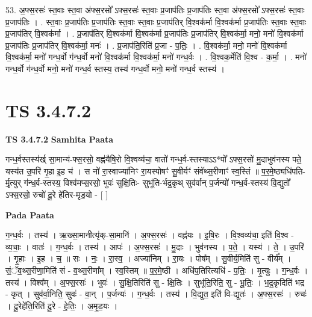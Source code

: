 \documentclass[17pt]{extarticle}
\begin{document}
53. अ॒फ्स॒रसः॑ स्त॒वाः स्त॒वा अ॑फ्स॒रसो᳚ ऽफ्स॒रसः॑ स्त॒वाः प्र॒जाप॑तिः प्र॒जाप॑तिः स्त॒वा अ॑फ्स॒रसो᳚ ऽफ्स॒रसः॑ स्त॒वाः प्र॒जाप॑तिः । . स्त॒वाः प्र॒जाप॑तिः प्र॒जाप॑तिः स्त॒वाः स्त॒वाः प्र॒जाप॑तिर् वि॒श्वक॑र्मा वि॒श्वक॑र्मा प्र॒जाप॑तिः स्त॒वाः स्त॒वाः 
प्र॒जाप॑तिर् वि॒श्वक॑र्मा । . प्र॒जाप॑तिर् वि॒श्वक॑र्मा वि॒श्वक॑र्मा प्र॒जाप॑तिः प्र॒जाप॑तिर् वि॒श्वक॑र्मा॒ मनो॒ मनो॑ वि॒श्वक॑र्मा 
प्र॒जाप॑तिः प्र॒जाप॑तिर् वि॒श्वक॑र्मा॒ मनः॑ । . प्र॒जाप॑ति॒रिति॑ प्र॒जा - प॒तिः॒ । . वि॒श्वक॑र्मा॒ मनो॒ मनो॑ वि॒श्वक॑र्मा वि॒श्वक॑र्मा॒ मनो॑ गन्ध॒र्वो ग॑न्ध॒र्वो मनो॑ वि॒श्वक॑र्मा वि॒श्वक॑र्मा॒ मनो॑ गन्ध॒र्वः । . वि॒श्वक॒र्मेति॑ वि॒श्व - क॒र्मा॒ । . मनो॑ गन्ध॒र्वो ग॑न्ध॒र्वो मनो॒ मनो॑ गन्ध॒र्व स्तस्य॒ तस्य॑ गन्ध॒र्वो मनो॒ मनो॑ गन्ध॒र्व स्तस्य॑ । \newline
\pagebreak
{}

\section{ TS 3.4.7.2 }

\textbf{TS 3.4.7.2 } \newline
\textbf{Samhita Paata} \newline

गन्ध॒र्वस्तस्य॑र्ख् सा॒मान्य॑-फ्स॒रसो॒ वह्न॑यैषि॒रो वि॒श्वव्य॑चा॒ वातो॑ गन्ध॒र्व-स्तस्याऽऽ*पो᳚ ऽफ्स॒रसो॑ मु॒दाभुव॑नस्य पते॒ यस्य॑त उ॒परि॑ गृ॒हा इ॒ह च॑ । स नो॑ रा॒स्वाज्या॑निꣳ रा॒यस्पोषꣳ॑ सु॒वीर्यꣳ॑ संवॅथ्स॒रीणाꣳ॑ स्व॒स्तिं ॥ प॒र॒मे॒ष्ठ्यधि॑पति-र्मृ॒त्युर् ग॑न्ध॒र्व-स्तस्य॒ विश्व॑मप्स॒रसो॒ भुवः॑ सुक्षि॒तिः- सुभू॑ति-र्भद्र॒कृथ् सुव॑र्वान् प॒र्जन्यो॑ गन्ध॒र्व-स्तस्य॑ वि॒द्युतो᳚ ऽफ्स॒रसो॒ रुचो॑ दू॒रे हे॑तिर-मृड॒यो - [  ] \newline

\textbf{Pada Paata} \newline

ग॒न्ध॒र्वः । तस्य॑ । ऋ॒ख्सा॒मानीत्यृ॑क्-सा॒मानि॑ । अ॒फ्स॒रसः॑ । वह्न॑यः । इ॒षि॒रः । वि॒श्वव्य॑चा॒ इति॑ वि॒श्व - व्य॒चाः॒ । वातः॑ । ग॒न्ध॒र्वः । तस्य॑ । आपः॑ । अ॒फ्स॒रसः॑ । मु॒दाः । भुव॑नस्य । प॒ते॒ । यस्य॑ । ते॒ । उ॒परि॑ । गृ॒हाः । इ॒ह । च॒ ॥ सः । नः॒ । रा॒स्व॒ । अज्या॑निम् । रा॒यः । पोष᳚म् । सु॒वीर्य॒मिति॑ सु - वीर्य᳚म् । सं॒ॅव॒थ्स॒रीणा॒मिति॑ सं - व॒थ्स॒रीणा᳚म् । स्व॒स्तिम् ॥ प॒र॒मे॒ष्ठी । अधि॑प॒तिरित्यधि॑ - प॒तिः॒ । मृ॒त्युः । ग॒न्ध॒र्वः । तस्य॑ । विश्व᳚म् । अ॒फ्स॒रसः॑ । भुवः॑ । सु॒क्षि॒तिरिति॑ सु - क्षि॒तिः । सुभू॑ति॒रिति॒ सु - भू॒तिः॒ । भ॒द्र॒कृदिति॑ भद्र - कृत् । सुव॑र्वा॒निति॒ सुवः॑ - वा॒न् । प॒र्जन्यः॑ । ग॒न्ध॒र्वः । तस्य॑ । वि॒द्युत॒ इति॑ वि-द्युतः॑ । अ॒फ्स॒रसः॑ । रुचः॑ । दू॒रेहे॑ति॒रिति॑ दू॒रे - हे॒तिः॒ । अ॒मृ॒ड॒यः ।  \newline
\end{document}
